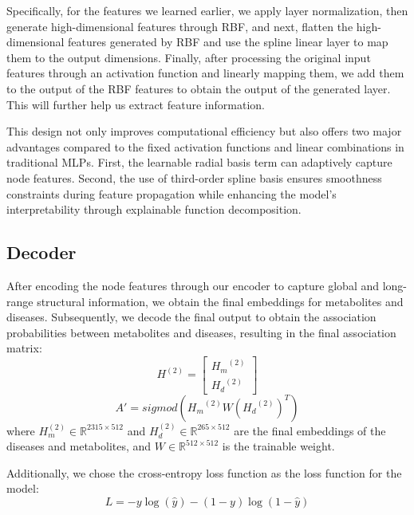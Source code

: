 \documentclass[a4paper,fleqn]{cas-dc}
\begin{document}
Specifically, for the features we learned earlier, we apply layer normalization, then generate high-dimensional features through RBF, and next, flatten the high-dimensional features generated by RBF and use the spline linear layer to map them to the output dimensions. Finally, after processing the original input features through an activation function and linearly mapping them, we add them to the output of the RBF features to obtain the output of the generated layer. This will further help us extract feature information.

This design not only improves computational efficiency but also offers two major advantages compared to the fixed activation functions and linear combinations in traditional MLPs. First, the learnable radial basis term can adaptively capture node features. Second, the use of third-order spline basis ensures smoothness constraints during feature propagation while enhancing the model's interpretability through explainable function decomposition.

\subsection{Decoder}
After encoding the node features through our encoder to capture global and long-range structural information, we obtain the final embeddings for metabolites and diseases. Subsequently, we decode the final output to obtain the association probabilities between metabolites and diseases, resulting in the final association matrix:
\begin{equation}
	H^{(2)} = \begin{bmatrix} {H_m}^{(2)}  \\ {H_d}^{(2)} \end{bmatrix}	
\end{equation}
\begin{equation}
	A' = sigmod \left({H_m}^{(2)} W  {({H_d}^{(2)})}^T \right)
\end{equation}
where \( H^{(2)}_m \in \mathbb{R}^{2315 \times 512} \) and \( H^{(2)}_d \in \mathbb{R}^{265 \times 512} \) are the final embeddings of the diseases and metabolites, and \( W \in \mathbb{R}^{512 \times 512} \) is the trainable weight.

Additionally, we chose the cross-entropy loss function \cite{mao2023cross} as the loss function for the model:
\begin{equation}
	L = -y \log(\hat{y}) - (1 - y) \log(1 - \hat{y})
\end{equation}
\end{document}
